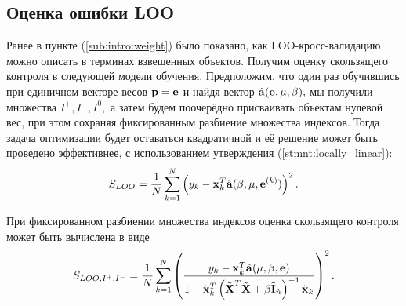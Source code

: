 \subsection{Оценка ошибки LOO}
Ранее в пункте (\ref{sub:intro:weight}) было показано, как LOO-кросс-валидацию можно описать в терминах взвешенных объектов.
Получим оценку скользящего контроля в следующей модели обучения. Предположим, что один раз обучившись при единичном векторе весов $\boldsymbol{\mathbf{p}} = \boldsymbol{\mathbf{e}}$ и найдя вектор $\hat{\boldsymbol{\mathbf{a}}}(\boldsymbol{\mathbf{e}}, {\mu,\beta}),$ мы получили множества $I^+, I^-, I^0,$ а затем будем поочерёдно присваивать объектам нулевой вес, при этом сохраняя фиксированным разбиение множества индексов. Тогда задача оптимизации будет оставаться квадратичной и её решение может быть проведено эффективнее, с использованием утверждения (\ref{stmnt:locally_linear}):
\begin{equation}
	\label{LOO}
	S_{LOO} = \frac1N\sum\limits_{k=1}^N \left(y_k - \boldsymbol{\mathbf{x}}_k^T\hat{\boldsymbol{\mathbf{a}}}(\beta, \mu, \boldsymbol{\mathbf{e}}^{(k)})\right)^2.
\end{equation}




\begin{statement}
\label{stmnt:CVI}
При фиксированном разбиении множества индексов оценка скользящего контроля может быть вычислена в виде
\begin{equation}
	\label{LOOfixed}
	S_{LOO, I^+, I^-} = \frac1N\sum\limits_{k=1}^N\left(\frac{y_k - \boldsymbol{\mathbf{x}}_k^T\hat{\boldsymbol{\mathbf{a}}}({\mu,\beta}, \boldsymbol{\mathbf{e}})}{1 - \tilde{\boldsymbol{\mathbf{x}}}_k^T\left(\tilde{\boldsymbol{\mathbf{X}}}^T\tilde{\boldsymbol{\mathbf{X}}} + \beta \tilde{\boldsymbol{\mathbf{I}}}_{\hat n}\right)^{-1}\tilde{\boldsymbol{\mathbf{x}}}_k}\right)^2.
\end{equation}
\end{statement}

